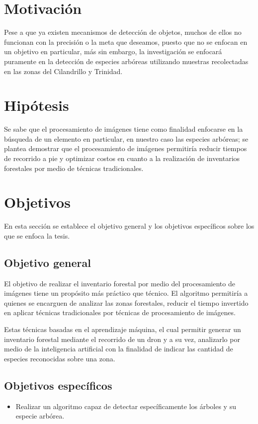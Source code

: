 \section{Motivación}
Pese a que ya existen mecanismos de detección de objetos, muchos de ellos no funcionan con la precisión o la meta que deseamos, puesto que no se enfocan en un objetivo en particular, más sin embargo, la investigación se enfocará puramente en la detección de especies arbóreas utilizando muestras recolectadas en las zonas del Cilandrillo y Trinidad.

\section{Hipótesis}
Se sabe que el procesamiento de imágenes tiene como finalidad enfocarse en
la búsqueda de un elemento en particular, en nuestro caso las especies arbóreas; se plantea demostrar que el procesamiento de imágenes permitiría reducir tiempos de recorrido a pie y optimizar costos en cuanto a la realización de inventarios forestales por medio de técnicas tradicionales.

\section{Objetivos}
En esta sección se establece el objetivo general y los objetivos específicos sobre los que se enfoca la tesis.

\subsection{Objetivo general}
El objetivo de realizar el inventario forestal por medio del procesamiento de
imágenes tiene un propósito más práctico que técnico. El algoritmo permitiría a quienes se encarguen de analizar las zonas forestales, reducir el tiempo invertido en aplicar técnicas tradicionales por técnicas de procesamiento de imágenes.

Estas técnicas  basadas en el aprendizaje máquina, el cual permitir
generar un inventario forestal mediante el recorrido de un dron y a su vez, analizarlo por medio de la inteligencia artificial con la finalidad de indicar las cantidad de especies reconocidas sobre una zona.

\subsection{Objetivos específicos}
\begin{itemize}
\item Realizar un algoritmo capaz de detectar específicamente los árboles y su especie arbórea.
\end{itemize}

